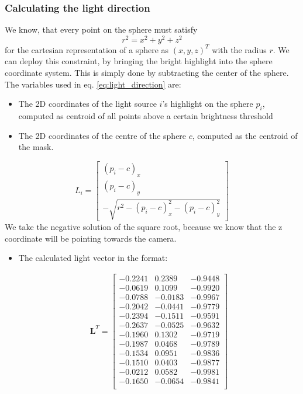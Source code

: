 \documentclass{paper}
\begin{document}
\subsubsection{Calculating the light direction} 
We know, that every point on the sphere must satisfy
\begin{equation*}
	r^2 = x^2 + y^2 + z^2
\end{equation*}
for the cartesian representation of a sphere as $(x,y,z)^T$ with the radius $r$. We can deploy this constraint, by bringing the bright
 highlight into the sphere coordinate system. This is simply done 
 by subtracting the center of the sphere. The variables used in eq. \ref{eq:light_direction} are:
\begin{itemize}
\item The 2D coordinates of the light source $i$'s highlight on the sphere $p_i$, computed as centroid of all points above a certain brightness threshold
\item The 2D coordinates of the centre of the sphere $c$, computed as the centroid of the mask.
\end{itemize}
\begin{equation}
	L_i = 
	\left[ 
	\begin{array}{c}
	(p_i - c)_x \\
	(p_i - c)_y \\
	-\sqrt{r^2 - (p_i - c)_x^2 - (p_i - c)_y^2}
\end{array} 
\right] 
\label{eq:light_direction}
\end{equation}
We take the negative solution of the square root, because we know that the z coordinate will be pointing towards the camera.
\begin{itemize}

\item The calculated light vector in the format:

\begin{align*}
\mathbf{L}^T= 
\left[ 
\begin{array}{cccccccccccccc}
-0.2241 & 0.2389 & -0.9448 \\ -0.0619 & 0.1099 & -0.9920 \\ -0.0788 & -0.0183 & -0.9967 \\ -0.2042 & -0.0441 & -0.9779 \\ -0.2394 & -0.1511 & -0.9591 \\ -0.2637 & -0.0525 & -0.9632 \\ -0.1960 & 0.1302 & -0.9719 \\ -0.1987 & 0.0468 & -0.9789 \\ -0.1534 & 0.0951 & -0.9836 \\ -0.1510 & 0.0403 & -0.9877 \\ -0.0212 & 0.0582 & -0.9981 \\ -0.1650 & -0.0654 & -0.9841 \\  
\end{array} 
\right] 
\end{align*}
\end{itemize}
\end{document}
